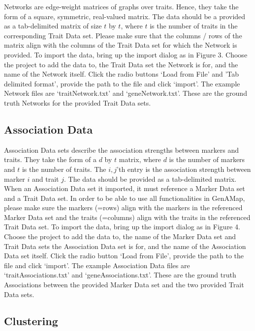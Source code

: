 \documentclass{article}
\begin{document}
Networks are edge-weight matrices of graphs over traits. Hence, they take the form of a square, symmetric, real-valued matrix. The data should be a provided as a tab-delimited matrix of size $t$ by $t$, where $t$ is the number of traits in the corresponding Trait Data set. Please make sure that the columns / rows of the matrix align with the columns of the Trait Data set for which the Network is provided. To import the data, bring up the import dialog as in Figure 3. Choose the project to add the data to, the Trait Data set the Network is for, and the name of the Network itself. Click the radio buttons `Load from File' and 'Tab delimited format', provide the path to the file and click `import'. The example Network files are `traitNetwork.txt' and `geneNetwork.txt'. These are the ground truth Networks for the provided Trait Data sets.

\subsection{Association Data}

Association Data sets describe the association strengths between markers and traits. They take the form of a $d$ by $t$ matrix, where $d$ is the number of markers and $t$ is the number of traits. The $i,j$'th entry is the association strength between marker $i$ and trait $j$. The data should be provided as a tab-delimited matrix. When an Association Data set it imported, it must reference a Marker Data set and a Trait Data set. In order to be able to use all functionalities in GenAMap, please make sure the markers (=rows) align with the markers in the referenced Marker Data set and the traits (=columns) align with the traits in the referenced Trait Data set. To import the data, bring up the import dialog as in Figure 4. Choose the project to add the data to, the name of the Marker Data set and Trait Data sets the Association Data set is for, and the name of the Association Data set itself. Click the radio button `Load from File', provide the path to the file and click `import'. The example Association Data files are `traitAssociations.txt' and `geneAssociations.txt'. These are the ground truth Associations between the provided Marker Data set and the two provided Trait Data sets.

\subsection{Clustering}
\end{document}
